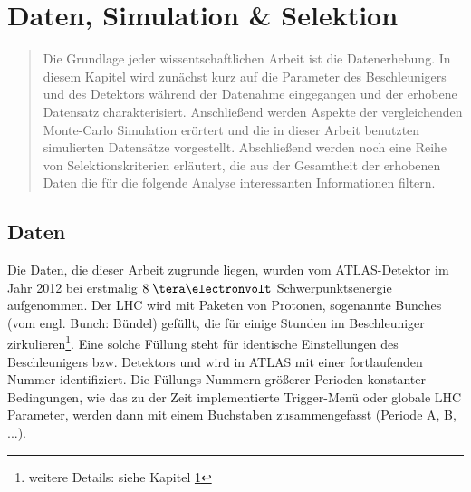 


\chapter{Daten, Simulation \texorpdfstring{\&}{und} Selektion}

\begin{quote}
    Die Grundlage jeder wissentschaftlichen Arbeit ist die Datenerhebung. In
    diesem Kapitel wird zunächst kurz auf die Parameter des Beschleunigers und
    des Detektors während der Datenahme eingegangen und der erhobene Datensatz
    charakterisiert. Anschließend werden Aspekte der vergleichenden Monte-Carlo 
    Simulation erörtert und die in dieser Arbeit benutzten simulierten
    Datensätze vorgestellt. Abschließend werden noch eine Reihe von
    Selektionskriterien erläutert, die aus der Gesamtheit der erhobenen Daten
    die für die folgende Analyse interessanten Informationen filtern.
\end{quote}



\section{Daten}
\label{data_sim_selection:data}


Die Daten, die dieser Arbeit zugrunde liegen, wurden vom ATLAS-Detektor im Jahr
2012 bei erstmalig $8 \TeV$ Schwerpunktsenergie aufgenommen. Der \ac{LHC} wird
mit Paketen von Protonen, sogenannte Bunches (vom engl. Bunch: Bündel) gefüllt,
die für einige Stunden im Beschleuniger zirkulieren\footnote{weitere Details:
siehe Kapitel \ref{}}.
Eine solche Füllung steht für identische Einstellungen des Beschleunigers bzw.
Detektors und wird in ATLAS mit einer fortlaufenden Nummer identifiziert.
Die Füllungs-Nummern größerer Perioden konstanter Bedingungen, wie das zu der
Zeit implementierte Trigger-Menü oder globale \ac{LHC} Parameter, werden dann
mit einem Buchstaben zusammengefasst (Periode A, B, ...).

